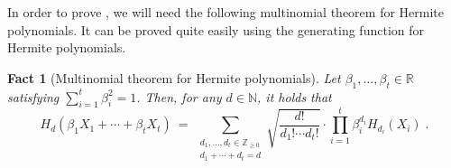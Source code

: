 \documentclass[11pt]{article}
\newcommand{\inparen}[1]{\left ( #1 \right )}
\newcommand{\bbN}{{\mathbb N}}
\newcommand{\bbR}{{\mathbb R}}
\newcommand{\bbZ}{{\mathbb Z}}
\newtheorem{fact}[theorem]{Fact}
\begin{document}
In order to prove , we will need the following multinomial theorem for Hermite polynomials. It can be proved quite easily using the generating function for Hermite polynomials.

\begin{fact}[Multinomial theorem for Hermite polynomials]\label{fact:multinomial_hermite}
	Let $\beta_1, \ldots, \beta_t \in \bbR$ satisfying $\sum_{i=1}^{t} \beta_i^2 = 1$. Then, for any $d \in \bbN$, it holds that
	\[ H_d\inparen{\beta_1 X_1 + \cdots + \beta_t X_t} \ = \ \sum_{\substack{d_1, \ldots, d_t \in \bbZ_{\ge 0} \\ d_1 + \cdots + d_t = d}} \sqrt{\frac{d!}{d_1! \cdots d_t!}} \cdot \prod_{i=1}^{t} \beta_i^{d_i} H_{d_i}(X_i)\;.\]
\end{fact}

\end{document}
